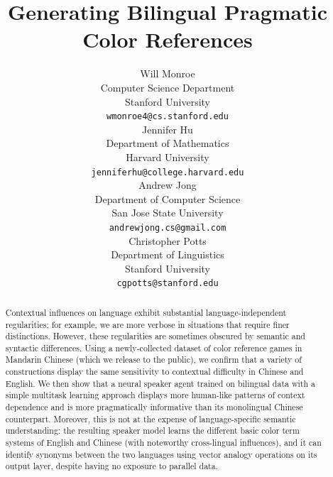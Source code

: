 \documentclass[11pt,a4paper]{article}
\title{Generating Bilingual Pragmatic Color References}
\author{Will Monroe \\
  Computer Science Department \\
  Stanford University \\
  {\tt wmonroe4@cs.stanford.edu} \\\And
  Jennifer Hu \\
  Department of Mathematics \\
  Harvard University \\
  {\tt jenniferhu@college.harvard.edu} \\\AND 
  Andrew Jong \\
  Department of Computer Science \\
  San Jose State University \\
  {\tt andrewjong.cs@gmail.com} \\\And
  Christopher Potts \\
  Department of Linguistics \\
  Stanford University \\
  {\tt cgpotts@stanford.edu} \\}
\date{}
\renewcommand{\|}{\mid}
\begin{document}
\maketitle
\begin{abstract}
 Contextual influences on language exhibit substantial language-independent
 regularities; for example, we are more verbose in situations that require finer
 distinctions. However, these regularities are sometimes obscured by semantic
 and syntactic differences. Using a newly-collected dataset of color reference games in Mandarin
 Chinese (which we release to the public), we confirm that a variety of constructions
 display the same sensitivity to contextual difficulty in Chinese and English. We
 then show that a neural speaker agent trained on bilingual data with a simple
 multitask learning approach displays more human-like patterns
 of context dependence and is more pragmatically informative than its monolingual
 Chinese counterpart. Moreover, this is not at the expense of language-specific
 semantic understanding: the resulting speaker model learns the different basic color
 term systems of English and Chinese (with noteworthy cross-lingual influences), and it
 can identify synonyms between the two languages using vector analogy operations on
 its output layer, despite having no exposure to parallel data.



\end{abstract}
\end{document}
